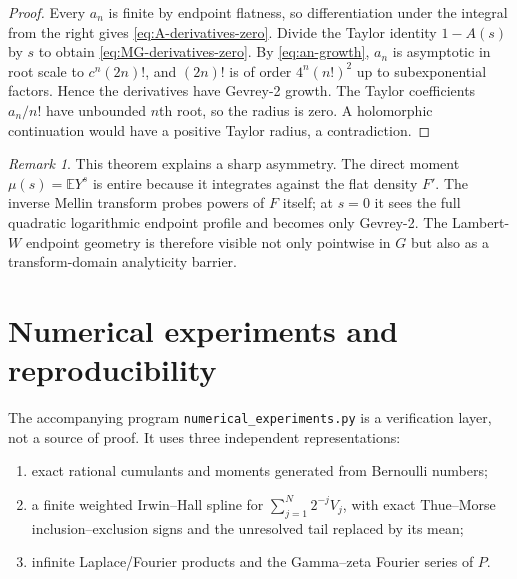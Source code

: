\documentclass[11pt]{article}
\theoremstyle{definition}
\theoremstyle{remark}
\newtheorem{remark}[theorem]{Remark}
\newcommand{\E}{\mathbb E}
\begin{document}
\begin{proof}
Every $a_n$ is finite by endpoint flatness, so differentiation under the integral from the
right gives \cref{eq:A-derivatives-zero}.  Divide the Taylor identity
$1-A(s)$ by $s$ to obtain \cref{eq:MG-derivatives-zero}.  By
\cref{eq:an-growth}, $a_n$ is asymptotic in root scale to
$c^n(2n)!$, and $(2n)!$ is of order $4^n(n!)^2$ up to subexponential factors.  Hence the
derivatives have Gevrey-2 growth.  The Taylor coefficients $a_n/n!$ have unbounded $n$th
root, so the radius is zero.  A holomorphic continuation would have a positive Taylor radius,
a contradiction.
\end{proof}

\begin{remark}
This theorem explains a sharp asymmetry.  The direct moment $\mu(s)=\E Y^s$ is entire because
it integrates against the flat density $F'$.  The inverse Mellin transform probes powers of
$F$ itself; at $s=0$ it sees the full quadratic logarithmic endpoint profile and becomes only
Gevrey-2.  The Lambert-$W$ endpoint geometry is therefore visible not only pointwise in $G$
but also as a transform-domain analyticity barrier.
\end{remark}

\section{Numerical experiments and reproducibility}
\label{sec:numerics}

The accompanying program \texttt{numerical\_experiments.py} is a verification layer, not a
source of proof.  It uses three independent representations:
\begin{enumerate}
\item exact rational cumulants and moments generated from Bernoulli numbers;
\item a finite weighted Irwin--Hall spline for
$\sum_{j=1}^{N}2^{-j}V_j$, with exact Thue--Morse inclusion--exclusion signs and the unresolved
tail replaced by its mean;
\item infinite Laplace/Fourier products and the Gamma--zeta Fourier series of $P$.
\end{enumerate}
\end{document}

